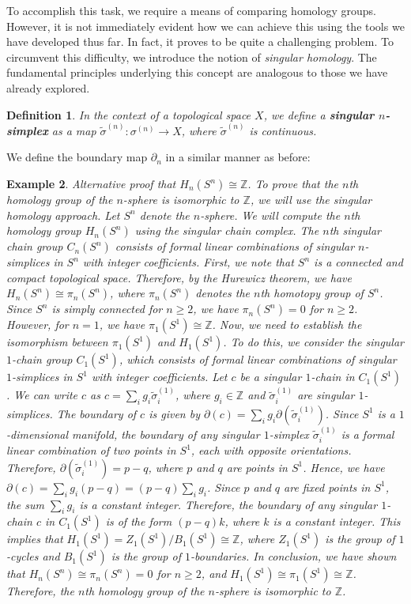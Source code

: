 \documentclass{article}
\newtheorem{definition}{Definition}[section]
\newtheorem{example}[definition]{Example}
\begin{document}
To accomplish this task, we require a means of comparing homology groups. However, it is not immediately evident how we can achieve this using the tools we have developed thus far. In fact, it proves to be quite a challenging problem. To circumvent this difficulty, we introduce the notion of \emph{singular homology}. The fundamental principles underlying this concept are analogous to those we have already explored.

\begin{definition}
In the context of a topological space $X$, we define a \textbf{singular $n$-simplex} as a map $\tilde{\sigma}^{(n)}: \sigma^{(n)} \rightarrow X$, where $\tilde{\sigma}^{(n)}$ is continuous.
\end{definition}

We define the boundary map $\partial_n$ in a similar manner as before:

\begin{example}
Alternative proof that $H_n(S^n) \cong \mathbb{Z}$. To prove that the $n$th homology group of the $n$-sphere is isomorphic to $\mathbb{Z}$, we will use the singular homology approach. Let $S^n$ denote the $n$-sphere. We will compute the $n$th homology group $H_n(S^n)$ using the singular chain complex. The $n$th singular chain group $C_n(S^n)$ consists of formal linear combinations of singular $n$-simplices in $S^n$ with integer coefficients. First, we note that $S^n$ is a connected and compact topological space. Therefore, by the Hurewicz theorem, we have $H_n(S^n) \cong \pi_n(S^n)$, where $\pi_n(S^n)$ denotes the $n$th homotopy group of $S^n$. Since $S^n$ is simply connected for $n \geq 2$, we have $\pi_n(S^n) = 0$ for $n \geq 2$. However, for $n = 1$, we have $\pi_1(S^1) \cong \mathbb{Z}$. Now, we need to establish the isomorphism between $\pi_1(S^1)$ and $H_1(S^1)$. To do this, we consider the singular $1$-chain group $C_1(S^1)$, which consists of formal linear combinations of singular $1$-simplices in $S^1$ with integer coefficients. Let $c$ be a singular $1$-chain in $C_1(S^1)$. We can write $c$ as $c = \sum_{i} g_i \tilde{\sigma}^{(1)}_i$, where $g_i \in \mathbb{Z}$ and $\tilde{\sigma}^{(1)}_i$ are singular $1$-simplices. The boundary of $c$ is given by $\partial(c) = \sum_{i} g_i \partial(\tilde{\sigma}^{(1)}_i)$. Since $S^1$ is a $1$-dimensional manifold, the boundary of any singular $1$-simplex $\tilde{\sigma}^{(1)}_i$ is a formal linear combination of two points in $S^1$, each with opposite orientations. Therefore, $\partial(\tilde{\sigma}^{(1)}_i) = p - q$, where $p$ and $q$ are points in $S^1$. Hence, we have $\partial(c) = \sum_{i} g_i (p - q) = (p - q) \sum_{i} g_i$. Since $p$ and $q$ are fixed points in $S^1$, the sum $\sum_{i} g_i$ is a constant integer. Therefore, the boundary of any singular $1$-chain $c$ in $C_1(S^1)$ is of the form $(p - q)k$, where $k$ is a constant integer. This implies that $H_1(S^1) = Z_1(S^1) / B_1(S^1) \cong \mathbb{Z}$, where $Z_1(S^1)$ is the group of $1$-cycles and $B_1(S^1)$ is the group of $1$-boundaries. In conclusion, we have shown that $H_n(S^n) \cong \pi_n(S^n) = 0$ for $n \geq 2$, and $H_1(S^1) \cong \pi_1(S^1) \cong \mathbb{Z}$. Therefore, the $n$th homology group of the $n$-sphere is isomorphic to $\mathbb{Z}$.
\end{example}
\end{document}
